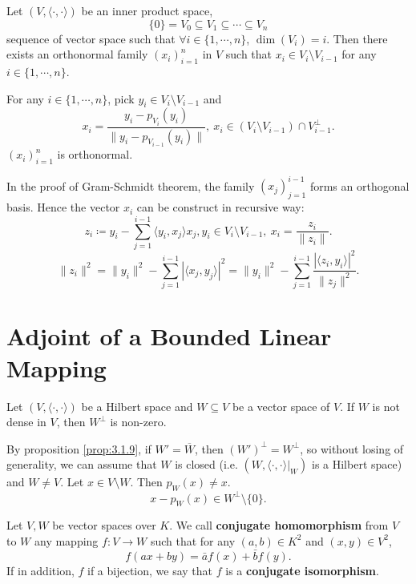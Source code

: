 \begin{theoremenv}
    Let $\left(V,\langle \cdot, \cdot\rangle\right)$ be an inner product space,
    $$ \{0\} = V_0\subseteq V_1 \subseteq \cdots \subseteq V_n$$
    sequence of vector space such that $\forall i\in \{1,\cdots,n\}$, $\dim \left(V_i\right) = i.$
    Then there exists an orthonormal family $\left(x_i\right)_{i=1}^n$ in $V$ such that $x_{i} \in V_i\setminus V_{i-1}$ for any $i\in \{1,\cdots,n\}$.
\end{theoremenv}
\begin{proofenv}
    For any $i \in \{1,\cdots,n\}$, pick $y_{i}\in V_i\setminus V_{i-1}$ and 
    $$ x_i = \frac{y_i - p_{V_i} (y_i)}{\| y_i - p_{V_{i-1}}(y_i)\|},\ x_i \in \left(V_i \setminus V_{i-1}\right)\cap V_{i-1}^\perp.$$
    $\left(x_i\right)_{i=1}^n$ is orthonormal.
\end{proofenv}
\begin{remark}
    In the proof of Gram-Schmidt theorem, the family $\left(x_j\right)_{j=1}^{i-1}$ forms an orthogonal basis.
    Hence the vector $x_i$ can be construct in recursive way:
    $$ z_i \coloneq y_i - \sum_{j=1}^{i-1} \langle y_i,x_j\rangle x_j, y_i \in V_i\setminus V_{i-1},\ x_i = \frac{z_i}{\|z_i\|}.$$
    $$ \|z_i\|^2 = \|y_i\|^2 - \sum_{j=1}^{i-1} |\langle x_j ,y_j \rangle|^2 = \|y_i\|^2 - \sum_{j=1}^{i-1}\frac{|\langle z_i, y_i\rangle|^2}{\|z_j\|^2}.$$
\end{remark}


\section{Adjoint of a Bounded Linear Mapping}

\begin{lemmaenv}\label{lem:3.3.1}
    Let $\left(V,\langle \cdot,\cdot\rangle\right)$ be a Hilbert space and $W\subseteq V$ be a vector space of $V$.
    If $W$ is not dense in $V$, then $W^\perp$ is non-zero.
\end{lemmaenv}
\begin{proofenv}
    By proposition \ref{prop:3.1.9}, if $W' = \overline{W}$, then $\left(W'\right)^\perp = W^\perp$, so without losing of generality,
    we can assume that $W$ is closed (i.e. $\left(W, \left.\langle\cdot,\cdot\rangle\right|_{W}\right)$ is a Hilbert space) and $W \neq V$.
    Let $x\in V\setminus W$. Then $p_W (x)\neq x$.
    $$ x - p_W(x) \in W^\perp\setminus \{0\}.$$
\end{proofenv}

\begin{definitionenv}
    Let $V,W$ be vector spaces over $K$.
    We call \textbf{conjugate homomorphism} from $V$ to $W$ any mapping $f:V\rightarrow W$ such that 
    for any $(a,b)\in K^2$ and $(x,y)\in V^2$,
    $$ f(ax +by) = \bar{a} f(x) + \bar{b}f(y).$$
    If in addition, $f$ if a bijection, we say that $f$ is a \textbf{conjugate isomorphism}.
\end{definitionenv}

